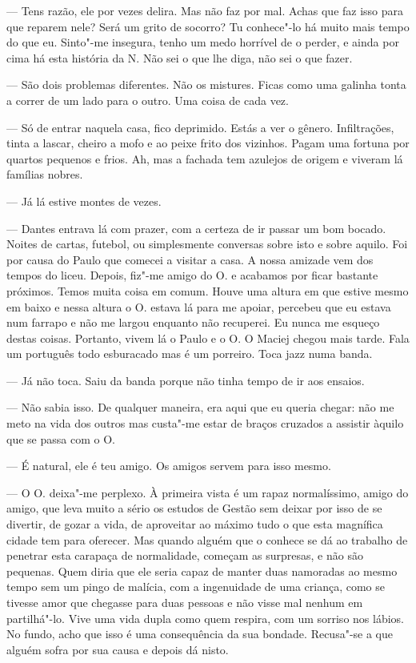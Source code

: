 --- Tens razão, ele por vezes delira. Mas não faz por mal. Achas que faz
  isso para que reparem nele? Será um grito de socorro? Tu conhece"-lo há
  muito mais tempo do que eu. Sinto"-me insegura, tenho um medo horrível
  de o perder, e ainda por cima há esta história da N. Não sei o que lhe
  diga, não sei o que fazer.

--- São dois problemas diferentes. Não os mistures. Ficas como uma galinha
  tonta a correr de um lado para o outro. Uma coisa de cada vez.


\medskip
\asterisc
\medskip

--- Só de entrar naquela casa, fico deprimido. Estás a ver o gênero.
  Infiltrações, tinta a lascar, cheiro a mofo e ao peixe frito dos
  vizinhos. Pagam uma fortuna por quartos pequenos e frios. Ah, mas a
  fachada tem azulejos de origem e viveram lá famílias nobres.


--- Já lá estive montes de vezes.

--- Dantes entrava lá com prazer, com a certeza de ir passar um bom
  bocado. Noites de cartas, futebol, ou simplesmente conversas sobre
  isto e sobre aquilo. Foi por causa do Paulo que comecei a visitar a
  casa. A nossa amizade vem dos tempos do liceu. Depois, fiz"-me amigo do
  O. e acabamos por ficar bastante próximos. Temos muita coisa em comum.
  Houve uma altura em que estive mesmo em baixo e nessa altura o O.
  estava lá para me apoiar, percebeu que eu estava num farrapo e não me
  largou enquanto não recuperei. Eu nunca me esqueço destas coisas.
  Portanto, vivem lá o Paulo e o O. O Maciej chegou mais tarde. Fala um
  português todo esburacado mas é um porreiro. Toca jazz numa banda.

--- Já não toca. Saiu da banda porque não tinha tempo de ir aos ensaios.

--- Não sabia isso. De qualquer maneira, era aqui que eu queria chegar:
  não me meto na vida dos outros mas custa"-me estar de braços cruzados a
  assistir àquilo que se passa com o O.

--- É natural, ele é teu amigo. Os amigos servem para isso mesmo.

--- O O. deixa"-me perplexo. À primeira vista é um rapaz normalíssimo,
  amigo do amigo, que leva muito a sério os estudos de Gestão sem deixar
  por isso de se divertir, de gozar a vida, de aproveitar ao máximo tudo
  o que esta magnífica cidade tem para oferecer. Mas quando alguém que o
  conhece se dá ao trabalho de penetrar esta carapaça de normalidade,
  começam as surpresas, e não são pequenas. Quem diria que ele seria
  capaz de manter duas namoradas ao mesmo tempo sem um pingo de malícia,
  com a ingenuidade de uma criança, como se tivesse amor que chegasse
  para duas pessoas e não visse mal nenhum em partilhá"-lo. Vive uma vida
  dupla como
quem respira, com um sorriso nos lábios. No fundo, acho que isso é uma
consequência da sua bondade. Recusa"-se a que alguém sofra por sua
causa e depois dá nisto.


